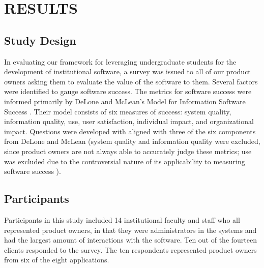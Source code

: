 \section{RESULTS}

\subsection{Study Design}
In evaluating our framework for leveraging undergraduate students for the development of institutional software, a survey was issued to all of our product owners asking them to evaluate the value of the software to them. Several factors were identified to gauge software success. The metrics for software success were informed primarily by DeLone and McLean's Model for Information Software Success \cite{delone1992softwaresuccess}. Their model consists of six measures of success: system quality, information quality, use, user satisfaction, individual impact, and organizational impact. Questions were developed with aligned with three of the six components from DeLone and McLean (system quality and information quality were excluded, since product owners are not always able to accurately judge these metrics; use was excluded due to the controversial nature of its applicability to measuring software success \cite{delone2003delone}). 


\subsection{Participants}
Participants in this study included 14 institutional faculty and staff who all represented product owners, in that they were administrators in the systems and had the largest amount of interactions with the software. Ten out of the fourteen clients responded to the survey. The ten respondents represented product owners from six of the eight applications. 

